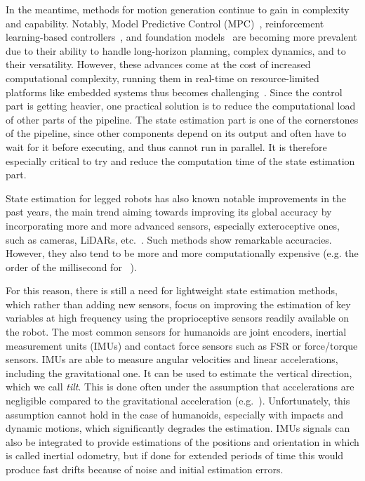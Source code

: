 \documentclass{IJCAS}
\begin{document}
In the meantime, methods for motion generation continue to gain in complexity and capability. Notably, Model Predictive Control (MPC)~\cite{Katayama2023MpcLeggedHumanoid, Dantec2022WholeBodyMPCTorqueControl, Dallard2024AdiosStabilizers}, reinforcement learning-based controllers~\cite{Peters2003ReinforcmentLearningForHumanoid, Li2025RLVersatileDynamicRobustBipedalLocom}, and foundation models~\cite{Bjorck2025GrootN1, kawaharazuka2024RealWorldApplicationsFoundationModels} are becoming more prevalent due to their ability to handle long-horizon planning, complex dynamics, and to their versatility. However, these advances come at the cost of increased computational complexity, running them in real-time on resource-limited platforms like embedded systems thus becomes challenging~\cite{Zeilinger2014RealTimeRobustMPC, findeisen2004computationalDelayNMPC, Thodoroff2022BenchmarkingRealTimeRL, Firoozi2025FoundationModelsInRobotics}. Since the control part is getting heavier, one practical solution is to reduce the computational load of other parts of the pipeline. The state estimation part is one of the cornerstones of the pipeline, since other components depend on its output and often have to wait for it before executing, and thus cannot run in parallel. It is therefore especially critical to try and reduce the computation time of the state estimation part.

State estimation for legged robots has also known notable improvements in the past years, the main trend aiming towards improving its global accuracy by incorporating more and more advanced sensors, especially exteroceptive ones, such as cameras, LiDARs, etc.~\cite{wisth2022vilens, fallon2018AccRobLocWalkRobotsImuVisLidar, Kuang2024TightlyCoupledLidarImuUwb}. Such methods show remarkable accuracies. However, they also tend to be more and more computationally expensive (e.g. the order of the millisecond for ~\cite{Kuang2024TightlyCoupledLidarImuUwb}).

For this reason, there is still a need for lightweight state estimation methods, which rather than adding new sensors, focus on improving the estimation of key variables at high frequency using the proprioceptive sensors readily available on the robot. The most common sensors for humanoids are joint encoders, inertial measurement units (IMUs) and contact force sensors such as FSR or force/torque sensors. IMUs are able to measure angular velocities and linear accelerations, including the gravitational one. It can be used to estimate the vertical direction, which we call \emph{tilt}. This is done often under the assumption that accelerations are negligible compared to the gravitational acceleration (e.g.~\cite{mahony2008NonlinearComplementaryFiltersOnSO3}). Unfortunately, this assumption cannot hold in the case of humanoids, especially with impacts and dynamic motions, which significantly degrades the estimation. IMUs signals can also be integrated to provide estimations of the positions and orientation in which is called inertial odometry, but if done for extended periods of time this would produce fast drifts because of noise and initial estimation errors.
\end{document}
